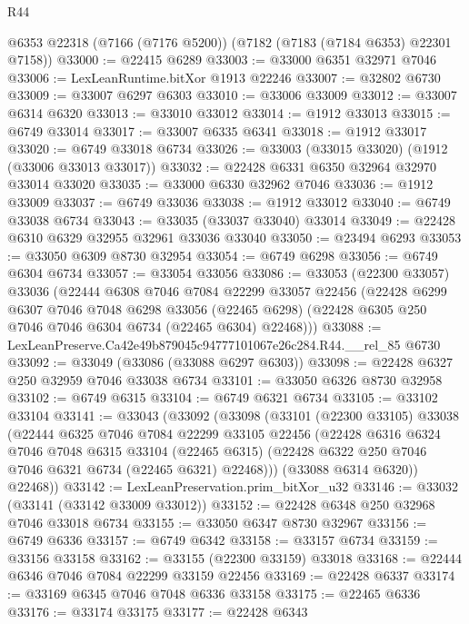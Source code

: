 \begin{lexlean}{R44}
\begin{coremodule}
{    @6353
    @22318
    (@7166 (@7176 @5200))
    (@7182 (@7183 (@7184 @6353) @22301 @7158))
@33000 := @22415 @6289
@33003 := @33000 @6351 @32971 @7046
@33006 := LexLeanRuntime.bitXor @1913 @22246
@33007 := @32802 @6730
@33009 := @33007 @6297 @6303
@33010 := @33006 @33009
@33012 := @33007 @6314 @6320
@33013 := @33010 @33012
@33014 := @1912 @33013
@33015 := @6749 @33014
@33017 := @33007 @6335 @6341
@33018 := @1912 @33017
@33020 := @6749 @33018 @6734
@33026 := @33003 (@33015 @33020) (@1912 (@33006 @33013 @33017))
@33032 := @22428 @6331 @6350 @32964 @32970 @33014 @33020
@33035 := @33000 @6330 @32962 @7046
@33036 := @1912 @33009
@33037 := @6749 @33036
@33038 := @1912 @33012
@33040 := @6749 @33038 @6734
@33043 := @33035 (@33037 @33040) @33014
@33049 := @22428 @6310 @6329 @32955 @32961 @33036 @33040
@33050 := @23494 @6293
@33053 := @33050 @6309 @8730 @32954
@33054 := @6749 @6298
@33056 := @6749 @6304 @6734
@33057 := @33054 @33056
@33086 := @33053
    (@22300 @33057)
    @33036
    (@22444
      @6308
      @7046
      @7084
      @22299
      @33057
      @22456
      (@22428
        @6299
        @6307
        @7046
        @7048
        @6298
        @33056
        (@22465 @6298)
        (@22428 @6305 @250 @7046 @7046 @6304 @6734 (@22465 @6304) @22468)))
@33088 := LexLeanPreserve.Ca42e49b879045c94777101067e26c284.R44.__rel_85 @6730
@33092 := @33049 (@33086 (@33088 @6297 @6303))
@33098 := @22428 @6327 @250 @32959 @7046 @33038 @6734
@33101 := @33050 @6326 @8730 @32958
@33102 := @6749 @6315
@33104 := @6749 @6321 @6734
@33105 := @33102 @33104
@33141 := @33043
    (@33092
      (@33098
        (@33101
          (@22300 @33105)
          @33038
          (@22444
            @6325
            @7046
            @7084
            @22299
            @33105
            @22456
            (@22428
              @6316
              @6324
              @7046
              @7048
              @6315
              @33104
              (@22465 @6315)
              (@22428 @6322 @250 @7046 @7046 @6321 @6734 (@22465 @6321) @22468)))
          (@33088 @6314 @6320))
        @22468))
@33142 := LexLeanPreservation.prim_bitXor_u32
@33146 := @33032 (@33141 (@33142 @33009 @33012))
@33152 := @22428 @6348 @250 @32968 @7046 @33018 @6734
@33155 := @33050 @6347 @8730 @32967
@33156 := @6749 @6336
@33157 := @6749 @6342
@33158 := @33157 @6734
@33159 := @33156 @33158
@33162 := @33155 (@22300 @33159) @33018
@33168 := @22444 @6346 @7046 @7084 @22299 @33159 @22456
@33169 := @22428 @6337
@33174 := @33169 @6345 @7046 @7048 @6336 @33158
@33175 := @22465 @6336
@33176 := @33174 @33175
@33177 := @22428 @6343
}
\end{coremodule}
\end{lexlean}
